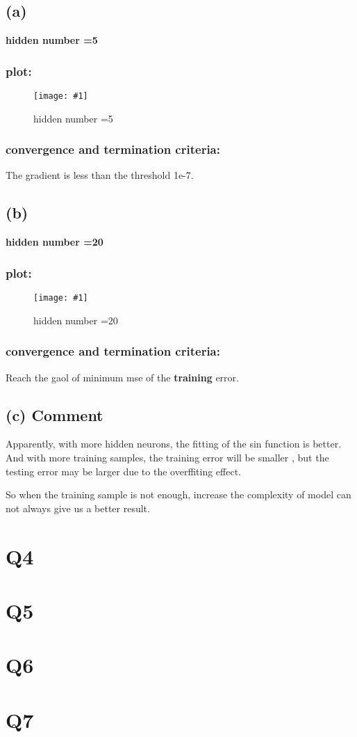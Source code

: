 \documentclass{article}
\newcommand{\myfigure}[3]{
	\begin{figure}[H]
		\centering
		\texttt{[image: \#1]}
		\caption{#2}
		\label{#3}
	\end{figure}
}
\begin{document}
		\subsection*{(a)}
			\textbf{hidden number =5}
			\subsubsection*{plot:}
			\myfigure{Q3_hidden_number_5_1.png}{hidden number =5}{Q3a}
			\subsubsection*{convergence and termination criteria:}
			The gradient is less than the threshold 1e-7.

		\subsection*{(b)}
			\textbf{hidden number =20}
			\subsubsection*{plot:}
			\myfigure{Q3_hidden_number_20_1.png}{hidden number =20}{Q3b}

			\subsubsection*{convergence and termination criteria:}
			Reach the gaol of minimum mse of the \textbf{training} error.

		\subsection*{(c) Comment}
			Apparently, with more hidden neurons, the fitting of the sin function
			is better. And with more training samples, the training error will be
			smaller , but the testing error may be larger due to the overffiting effect.
			
			So when the training sample is not enough, increase the complexity of model can not always give us a better result. 

	\newpage
  \section*{Q4}

	\newpage
  \section*{Q5}

	\newpage
	\section*{Q6}

	\newpage
  \section*{Q7}
\end{document}

